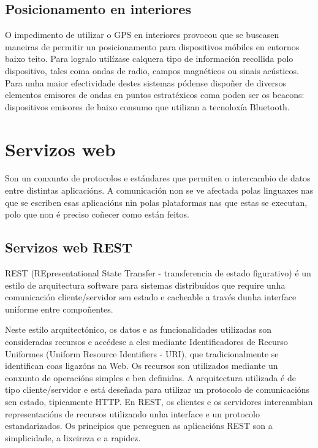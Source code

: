 \subsection{Posicionamento en interiores}

O impedimento de utilizar o GPS en interiores provocou que se buscasen maneiras de permitir un posicionamento para dispositivos móbiles en entornos baixo teito. Para logralo utilízase calquera tipo de información recollida polo dispositivo, tales coma ondas de radio, campos magnéticos ou sinais acústicos. Para unha maior efectividade destes sistemas pódense dispoñer de diversos elementos emisores de ondas en puntos estratéxicos coma poden ser os beacons: dispositivos emisores de baixo consumo que utilizan a tecnoloxía Bluetooth.


\section{Servizos web}

Son un conxunto de protocolos e estándares que permiten o intercambio de datos entre distintas aplicacións. A comunicación non se ve afectada polas linguaxes nas que se escriben esas aplicacións nin polas plataformas nas que estas se executan, polo que non é preciso coñecer como están feitos.

\subsection{Servizos web REST}

REST (REpresentational State Transfer - transferencia de estado figurativo) é un estilo de arquitectura software para sistemas distribuídos que require unha comunicación cliente/servidor sen estado e cacheable a través dunha interface uniforme entre compoñentes.

Neste estilo arquitectónico, os datos e as funcionalidades utilizadas son consideradas recursos e accédese a eles mediante Identificadores de Recurso Uniformes (Uniform Resource Identifiers - URI), que tradicionalmente se identifican coas ligazóns na Web. Os recursos son utilizados mediante un conxunto de operacións simples e ben definidas. A arquitectura utilizada é de tipo cliente/servidor e está deseñada para utilizar un protocolo de comunicacións sen estado, tipicamente HTTP. En REST, os clientes e os servidores intercambian representacións de recursos utilizando unha interface e un protocolo estandarizados. Os principios que perseguen as aplicacións REST son a simplicidade, a lixeireza e a rapidez.